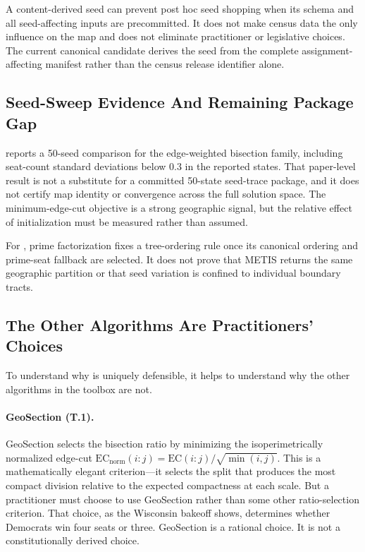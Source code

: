 A content-derived seed can prevent post hoc seed shopping when its schema and
all seed-affecting inputs are precommitted. It does not make census data the
only influence on the map and does not eliminate practitioner or legislative
choices. The current canonical candidate derives the seed from the complete
assignment-affecting manifest rather than the census release identifier alone.

\subsection{Seed-Sweep Evidence And Remaining Package Gap}

\citet{b7paper} reports a 50-seed comparison for the edge-weighted bisection
family, including seat-count standard deviations below 0.3 in the reported
states. That paper-level result is not a substitute for a committed 50-state
seed-trace package, and it does not certify \ar{} map identity or convergence
across the full solution space.
The minimum-edge-cut objective is a strong geographic signal, but the relative
effect of initialization must be measured rather than assumed.

For \ar{}, prime factorization fixes a tree-ordering rule once its canonical
ordering and prime-seat fallback are selected. It does not prove that METIS
returns the same geographic partition or that seed variation is confined to
individual boundary tracts.

\subsection{The Other Algorithms Are Practitioners' Choices}

To understand why \ar{} is uniquely defensible, it helps to understand
why the other algorithms in the toolbox are not.

\paragraph{GeoSection (T.1).}
GeoSection \citep{b8paper} selects the bisection ratio by minimizing the
isoperimetrically normalized edge-cut $\mathrm{EC}_\text{norm}(i:j) = \mathrm{EC}(i:j)/\sqrt{\min(i,j)}$.
This is a mathematically elegant criterion---it selects the split that
produces the most compact division relative to the expected compactness
at each scale.
But a practitioner must choose to use GeoSection rather than some other
ratio-selection criterion.
That choice, as the Wisconsin bakeoff shows, determines whether Democrats
win four seats or three.
GeoSection is a rational choice.
It is not a constitutionally derived choice.

